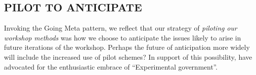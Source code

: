 \subsection*{\normalsize{} PILOT TO ANTICIPATE {\hfill \sensory}}

Invoking the {\sc Going Meta} pattern, we reflect that our strategy of
\emph{piloting our workshop methods} was how we choose to anticipate
the issues likely to arise in future iterations of the workshop.
Perhaps the future of anticipation more widely will include the
increased use of pilot schemes?  In support of this possibility, \citet{unger2019imagination} have advocated for the enthusiastic embrace of “Experimental government”.
